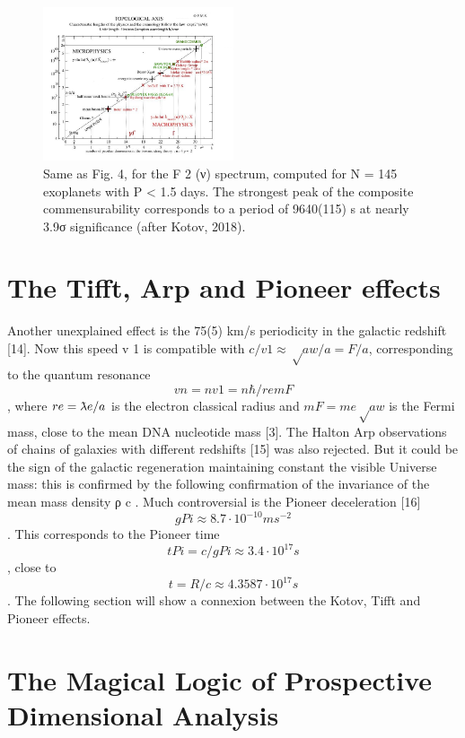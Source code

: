 \begin{figure}
\centering
\includegraphics[width=0.5\textwidth]{./figures/figure}
\caption{Same as Fig. 4, for the F 2 (ν) spectrum, computed for N = 145 exoplanets with P < 1.5
days. The strongest peak of the composite commensurability corresponds to a period of 9640(115) s
at nearly 3.9σ significance (after Kotov, 2018).}
\label{fig:figure_label}
\end{figure}


\section {The Tifft, Arp and Pioneer effects}

Another unexplained effect is the 75(5) km/s periodicity in the galactic redshift [14]. Now this
speed v 1 is compatible with $c/v 1 ≈ √a w /a = F/a$, corresponding to the quantum resonance $$v n = nv 1 =n\hbar /r e m F $$, where $r e = \lambdabar e /a$ is the electron classical radius and $m F = m e √a w$ is the Fermi mass, close to the
mean DNA nucleotide mass [3].
The Halton Arp observations of chains of galaxies with different redshifts [15] was also
rejected. But it could be the sign of the galactic regeneration maintaining constant the visible
Universe mass: this is confirmed by the following confirmation of the invariance of the mean mass
density ρ c .
Much controversial is the Pioneer deceleration [16] $$g Pi ≈ 8.7 \cdot 10^{-10} ms^{-2}$$ . This corresponds to
the Pioneer time $$t Pi = c/g Pi ≈ 3.4 \cdot 10^{17} s$$, close to $$t = R/c ≈ 4.3587 \cdot 10^{17} s$$. The following section will show a connexion between the Kotov, Tifft and Pioneer effects.

\section {The Magical Logic of Prospective Dimensional Analysis}

